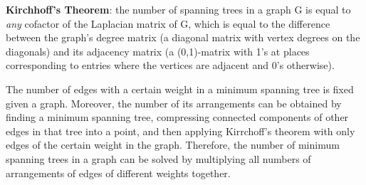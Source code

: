 \textbf{Kirchhoff's Theorem}: the number of spanning trees in a graph G is equal to \emph{any} cofactor of the Laplacian matrix of G, which is equal to the difference between the graph's degree matrix (a diagonal matrix with vertex degrees on the diagonals) and its adjacency matrix (a (0,1)-matrix with 1's at places corresponding to entries where the vertices are adjacent and 0's otherwise).

The number of edges with a certain weight in a minimum spanning tree is fixed given a graph. Moreover, the number of its arrangements can be obtained by finding a minimum spanning tree, compressing connected components of other edges in that tree into a point, and then applying Kirrchoff's theorem with only edges of the certain weight in the graph. Therefore, the number of minimum spanning trees in a graph can be solved by multiplying all numbers of arrangements of edges of different weights together.


